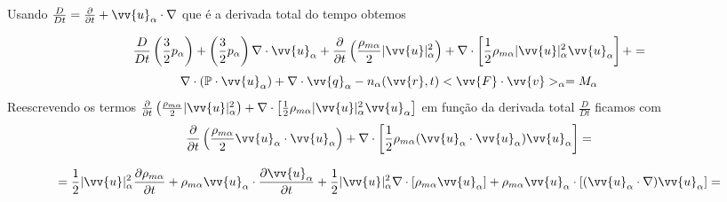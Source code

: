 \documentclass[12pt,oneside,a4paper]{abntex2}
\theoremstyle{definition}  %
\begin{document}
Usando $\frac{D}{Dt} = \frac{\partial }{\partial t} + \vv{u}_\alpha \cdot \nabla$ que é a derivada total do tempo obtemos

\begin{equation}
\label{eq: p5}
\frac{D}{Dt} \left( \frac{3}{2}p_\alpha \right) + \left(\frac{3}{2}p_\alpha \right)  \nabla \cdot \vv{u}_\alpha +  \frac{\partial }{\partial t} \left(\frac{\rho_{m\alpha}}{2} |\vv{u}|^2_\alpha \right) +\nabla \cdot \left[ \frac{1}{2}\rho_{m\alpha}|\vv{u}|^2_\alpha \vv{u}_\alpha \right]+  = 
\end{equation}
\begin{equation*}
\nabla \cdot (\mathbb{P} \cdot \vv{u}_\alpha) + \nabla \cdot \vv{q}_\alpha-n_\alpha(\vv{r},t) <\vv{F} \cdot \vv{v}>_\alpha = M_\alpha
\end{equation*}
Reescrevendo os termos $\frac{\partial }{\partial t} \left(\frac{\rho_{m\alpha}}{2} |\vv{u}|^2_\alpha \right) +\nabla \cdot \left[ \frac{1}{2}\rho_{m\alpha}|\vv{u}|^2_\alpha \vv{u}_ \alpha \right]$ em função da derivada total $\frac{D}{Dt}$ ficamos com
\begin{equation}
\frac{\partial }{\partial t} \left(\frac{\rho_{m\alpha}}{2}\vv{u}_\alpha \cdot \vv{u}_\alpha \right) +\nabla \cdot \left[ \frac{1}{2}\rho_{m\alpha}(\vv{u}_\alpha \cdot \vv{u}_ \alpha) \vv{u}_\alpha \right] = 
\end{equation}

\begin{equation*}
= \frac{1}{2}|\vv{u}|^2_\alpha \frac{\partial \rho_{m\alpha} }{\partial t} + \rho_{m\alpha} \vv{u}_\alpha \cdot \frac{\partial \vv{u}_\alpha}{\partial t} +
\frac{1}{2}|\vv{u}|^2_\alpha \nabla \cdot \left[ \rho_{m\alpha}  \vv{u}_\alpha \right] + \rho_{m\alpha}  \vv{u}_\alpha  \cdot \left[ (\vv{u}_\alpha \cdot \nabla )\vv{u}_\alpha  \right] = 
\end{equation*}
\end{document}
